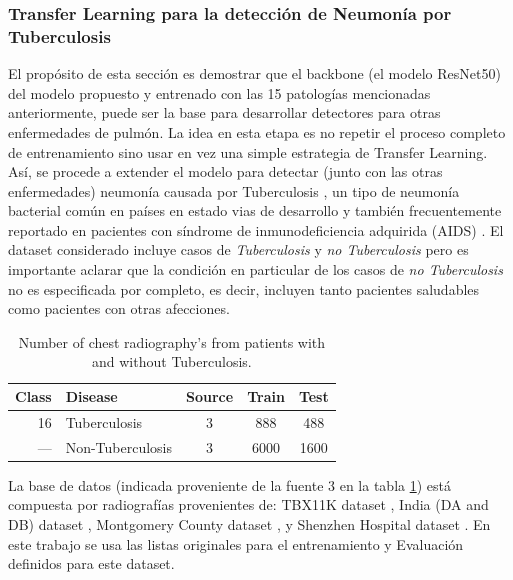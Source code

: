 {\subsubsection{Transfer Learning para la detección de Neumonía por Tuberculosis}

El propósito de esta sección es demostrar que el backbone (el modelo ResNet50) del modelo propuesto
y entrenado con las 15 patologías mencionadas anteriormente, puede ser la base para desarrollar
detectores para otras enfermedades de pulmón. La idea en esta etapa es no repetir el proceso
completo de entrenamiento sino usar en vez una simple estrategia de Transfer Learning. Así, se
procede a extender el modelo para detectar (junto con las otras enfermedades) neumonía causada por
Tuberculosis \cite{stirenko2018chest}, un tipo de neumonía bacterial común en países en estado vias
de desarrollo y también frecuentemente reportado en pacientes con síndrome de inmunodeficiencia
adquirida (AIDS) \cite{matsuura2018tuberculous}. El dataset considerado incluye casos de
\textit{Tuberculosis} y \textit{no Tuberculosis} pero es
importante aclarar que la condición en particular de los casos de \textit{no Tuberculosis} no es
especificada por completo, es decir, incluyen tanto pacientes saludables como pacientes con otras
afecciones.

\begin{table}[!ht]
    \centering
    \begin{tabular}{| r |l | c | c | c |}
     \hline
     Class & Disease & Source & Train & Test  \\
     \hline\hline
     16  & Tuberculosis        & 3 & 888   & 488  \\
     ---&  Non-Tuberculosis     & 3 & 6000  & 1600 \\
     \hline
    \end{tabular}
    \caption{Number of chest radiography's from patients with and without Tuberculosis.}
\label{table_dataset_tb}
\end{table}

La base de datos (indicada proveniente de la fuente 3 en la tabla \ref{table_dataset_tb}) está
compuesta por radiografías provenientes de: TBX11K dataset \cite{liu2020rethinking},
India (DA and DB) dataset \cite{chauhan2014role}, Montgomery County dataset \cite{jaeger2014two}, y
Shenzhen Hospital dataset \cite{jaeger2014two}. En este trabajo se usa las listas originales para el
entrenamiento y Evaluación definidos para este dataset.

}
